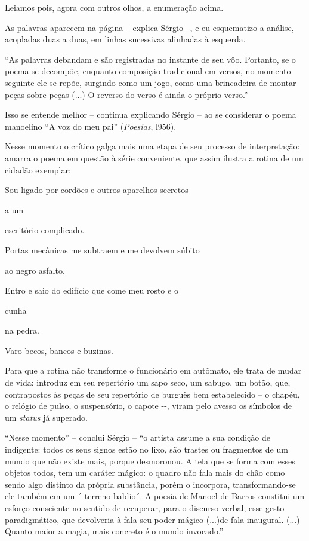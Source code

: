 Leiamos pois, agora com outros olhos, a enumeração acima.

As palavras aparecem na página -- explica Sérgio --, e eu esquematizo a
análise, acopladas duas a duas, em linhas sucessivas alinhadas à
esquerda.

``As palavras debandam e são registradas no instante de seu vôo.
Portanto, se o poema se decompõe, enquanto composição tradicional em
versos, no momento seguinte ele se repõe, surgindo como um jogo, como
uma brincadeira de montar peças sobre peças (...) O reverso do verso é
ainda o próprio verso.''

Isso se entende melhor -- continua explicando Sérgio -- ao se considerar
o poema manoelino ``A voz do meu pai'' (\emph{Poesias}, l956).

Nesse momento o crítico galga mais uma etapa de seu processo de
interpretação: amarra o poema em questão à série conveniente, que assim
ilustra a rotina de um cidadão exemplar:

Sou ligado por cordões e outros aparelhos secretos

a um

escritório complicado.

Portas mecânicas me subtraem e me devolvem súbito

ao negro asfalto.

Entro e saio do edifício que come meu rosto e o

cunha

na pedra.

Varo becos, bancos e buzinas.

Para que a rotina não transforme o funcionário em autômato, ele trata de
mudar de vida: introduz em seu repertório um sapo seco, um sabugo, um
botão, que, contrapostos às peças de seu repertório de burguês bem
estabelecido -- o chapéu, o relógio de pulso, o suspensório, o capote
-\/-, viram pelo avesso os símbolos de um \emph{status} já superado.

``Nesse momento'' -- conclui Sérgio -- ``o artista assume a sua condição
de indigente: todos os seus signos estão no lixo, são trastes ou
fragmentos de um mundo que não existe mais, porque desmoronou. A tela
que se forma com esses objetos todos, tem um caráter mágico: o quadro
não fala mais do chão como sendo algo distinto da própria substância,
porém o incorpora, transformando-se ele também em um ´ terreno baldio´.
A poesia de Manoel de Barros constitui um esforço consciente no sentido
de recuperar, para o discurso verbal, esse gesto paradigmático, que
devolveria à fala seu poder mágico (...)de fala inaugural. (...) Quanto
maior a magia, mais concreto é o mundo invocado.''

